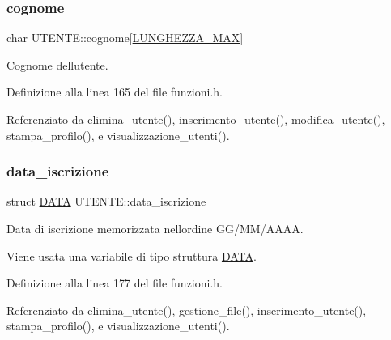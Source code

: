 \mbox{\label{struct_u_t_e_n_t_e_ad7797bd318a25af80b02a7751ebd4b9a}} 
\subsubsection{\texorpdfstring{cognome}{cognome}}
{\footnotesize\ttfamily char U\+T\+E\+N\+T\+E\+::cognome\mbox{[}\hyperlink{funzioni_8h_a2cdd71b92d6e869f8b094e32a6da6a62}{L\+U\+N\+G\+H\+E\+Z\+Z\+A\+\_\+\+M\+AX}\mbox{]}}

Cognome dell\textquotesingle{}utente. 

Definizione alla linea 165 del file funzioni.\+h.



Referenziato da elimina\+\_\+utente(), inserimento\+\_\+utente(), modifica\+\_\+utente(), stampa\+\_\+profilo(), e visualizzazione\+\_\+utenti().

\mbox{\label{struct_u_t_e_n_t_e_adad490891a61a9c3d48062baa067c1e9}} 
\subsubsection{\texorpdfstring{data\+\_\+iscrizione}{data\_iscrizione}}
{\footnotesize\ttfamily struct \hyperlink{struct_d_a_t_a}{D\+A\+TA} U\+T\+E\+N\+T\+E\+::data\+\_\+iscrizione}



Data di iscrizione memorizzata nell\textquotesingle{}ordine G\+G/\+M\+M/\+A\+A\+AA. 

Viene usata una variabile di tipo struttura \hyperlink{struct_d_a_t_a}{D\+A\+TA}. 

Definizione alla linea 177 del file funzioni.\+h.



Referenziato da elimina\+\_\+utente(), gestione\+\_\+file(), inserimento\+\_\+utente(), stampa\+\_\+profilo(), e visualizzazione\+\_\+utenti().

\mbox{\label{struct_u_t_e_n_t_e_aae6578862368788ad3bbc4af47a36ee0}} 
